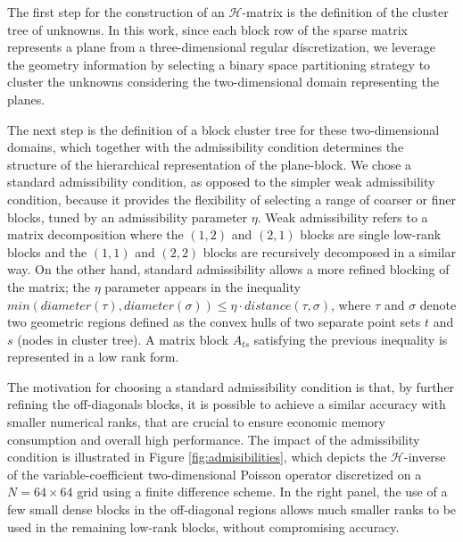 \documentclass[]{elsarticle}
\begin{document}
The first step for the construction of an $\mathcal{H}$-matrix is the definition of the cluster tree of unknowns. In this work, since each block row of the sparse matrix represents a plane from a three-dimensional regular discretization, we leverage the geometry information by selecting a binary space partitioning strategy to cluster the unknowns considering the two-dimensional domain representing the planes. 

The next step is the definition of a block cluster tree for these two-dimensional domains, which together with the admissibility condition determines the structure of the hierarchical representation of the plane-block. We chose a standard admissibility condition, as opposed to the simpler weak admissibility condition, because it provides the flexibility of selecting a range of coarser or finer blocks, tuned by an admissibility parameter $\eta$. Weak admissibility refers to a matrix decomposition where the $(1,2)$ and $(2,1)$ blocks are single low-rank blocks and the $(1,1)$ and $(2,2)$ blocks are recursively decomposed in a similar way. 
On the other hand, standard admissibility allows a more refined blocking of the matrix; the $\eta$ parameter appears in the inequality $min( diameter(\tau), diameter(\sigma) ) \leq \eta \cdot distance(\tau,\sigma)$, where $\tau$ and $\sigma$ denote two geometric regions defined as the convex hulls of two separate point sets $t$ and $s$ (nodes in cluster tree). A matrix block $A_{ts}$ satisfying the previous inequality is represented in a low rank form.

The motivation for choosing a standard admissibility condition is that, by further refining the off-diagonals blocks, it is possible to achieve a similar accuracy with smaller numerical ranks, that are crucial to ensure economic memory consumption and overall high performance. The impact of the admissibility condition is illustrated in Figure \ref{fig:admisibilities}, which depicts the $\mathcal{H}$-inverse of the variable-coefficient two-dimensional Poisson operator discretized on a $N=64\times64$ grid using a finite difference scheme. In the right panel, the use of a few small dense blocks in the off-diagonal regions allows much smaller ranks to be used in the remaining low-rank blocks, without compromising accuracy.
\end{document}
